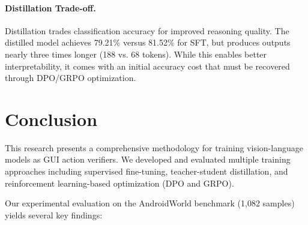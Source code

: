 \documentclass[11pt,a4paper]{article}
\begin{document}
\paragraph{Distillation Trade-off.} Distillation trades classification accuracy for improved reasoning quality. The distilled model achieves 79.21\% versus 81.52\% for SFT, but produces outputs nearly three times longer (188 vs. 68 tokens). While this enables better interpretability, it comes with an initial accuracy cost that must be recovered through DPO/GRPO optimization.


\section{Conclusion}

This research presents a comprehensive methodology for training vision-language models as GUI action verifiers. We developed and evaluated multiple training approaches including supervised fine-tuning, teacher-student distillation, and reinforcement learning-based optimization (DPO and GRPO).

Our experimental evaluation on the AndroidWorld benchmark (1,082 samples) yields several key findings:
\end{document}
